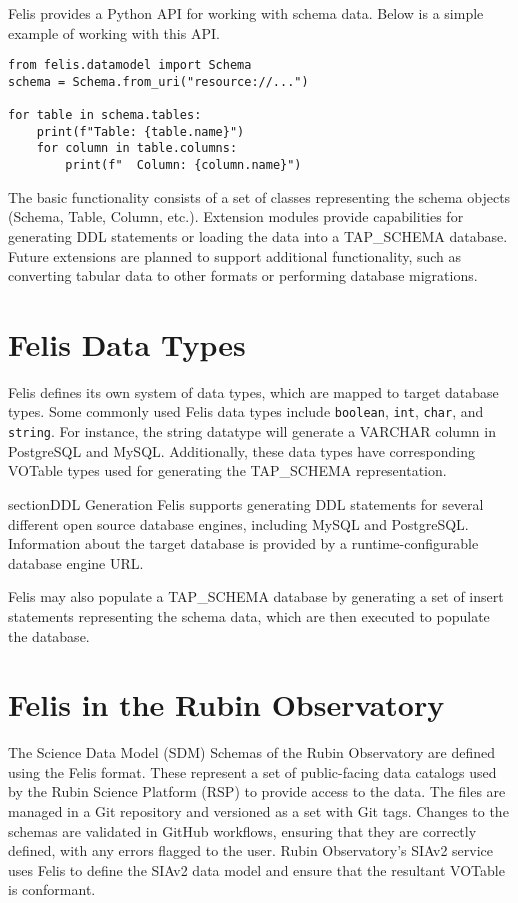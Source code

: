 \documentclass[11pt,twoside]{article}
\begin{document}
Felis provides a Python API for working with schema data.
Below is a simple example of working with this API.
\begin{verbatim}
from felis.datamodel import Schema
schema = Schema.from_uri("resource://...")

for table in schema.tables:
    print(f"Table: {table.name}")
    for column in table.columns:
        print(f"  Column: {column.name}")
\end{verbatim}
The basic functionality consists of a set of classes representing the schema objects (Schema, Table, Column, etc.).
Extension modules provide capabilities for generating DDL statements or loading the data into a TAP\_SCHEMA database.
Future extensions are planned to support additional functionality, such as converting tabular data to other formats or performing database migrations.

\section{Felis Data Types}

Felis defines its own system of data types, which are mapped to target database types.
Some commonly used Felis data types include \texttt{boolean}, \texttt{int}, \texttt{char}, and \texttt{string}.
For instance, the string datatype will generate a VARCHAR column in PostgreSQL and MySQL.
Additionally, these data types have corresponding VOTable types used for generating the TAP\_SCHEMA representation.

section{DDL Generation}
Felis supports generating DDL statements for several different open source database engines, including MySQL and PostgreSQL.
Information about the target database is provided by a runtime-configurable database engine URL.

Felis may also populate a TAP\_SCHEMA database by generating a set of insert statements representing the schema data, which are then executed to populate the database.

\section{Felis in the Rubin Observatory}

The Science Data Model (SDM) Schemas of the Rubin Observatory \citep[e.g.,][]{LSE-163} are defined using the Felis format.
These represent a set of public-facing data catalogs used by the Rubin Science Platform (RSP) to provide access to the data.
The files are managed in a Git repository and versioned as a set with Git tags.
Changes to the schemas are validated in GitHub workflows, ensuring that they are correctly defined, with any errors flagged to the user.
Rubin Observatory's SIAv2 service \citep{P920_adassxxxiv} uses Felis to define the SIAv2 data model and ensure that the resultant VOTable is conformant.
\end{document}
